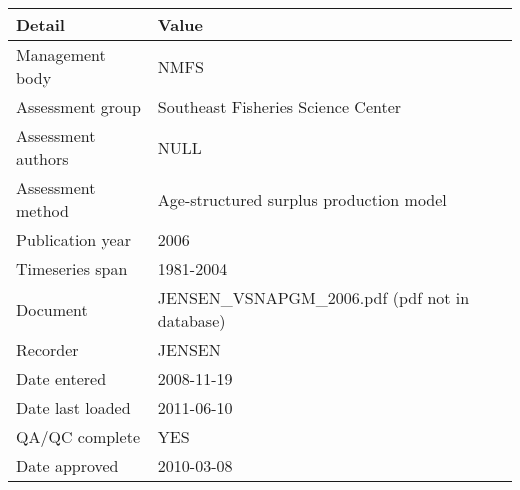 \begin{table}[htb]
\centering
\begin{tabular}{lp{7cm}}
\toprule
Detail & Value \\
\midrule
Management body    & NMFS                                            \\
Assessment group   & Southeast Fisheries Science Center              \\
Assessment authors & NULL                                            \\
Assessment method  & Age-structured surplus production model         \\
Publication year   & 2006                                            \\
Timeseries span    & 1981-2004                                       \\
Document           & JENSEN\_VSNAPGM\_2006.pdf (pdf not in database) \\
Recorder           & JENSEN                                          \\
Date entered       & 2008-11-19                                      \\
Date last loaded   & 2011-06-10                                      \\
QA/QC complete     & YES                                             \\
Date approved      & 2010-03-08                                      \\
\bottomrule
\end{tabular}
\label{tab:assessdet}
\end{table}
